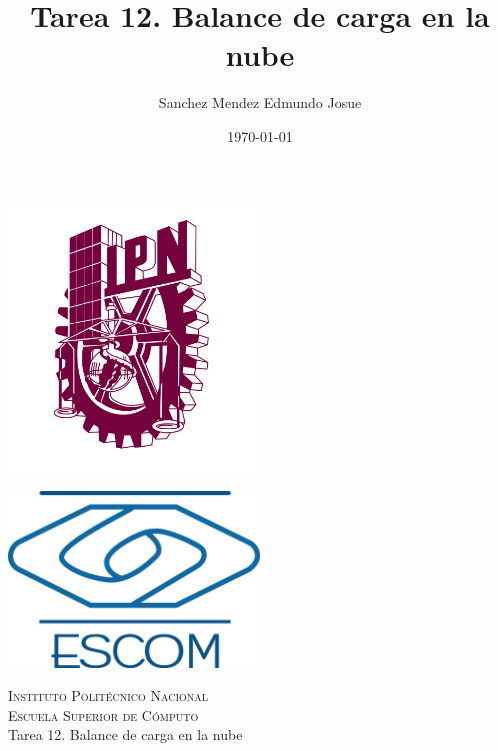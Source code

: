 \documentclass[11pt]{article}
\date{\today}
\title{Tarea 12. Balance de carga en la nube}
\author{Sanchez Mendez Edmundo Josue}
\begin{document}
		\begin{titlepage}
			\begin{center}
				
				
				\noindent
				\begin{minipage}{0.5\textwidth}
					\begin{flushleft} \large
						\includegraphics[width=0.5\textwidth]{resources/ipn.png}
					\end{flushleft}
				\end{minipage}%
				\begin{minipage}{0.55\textwidth}
					\begin{flushright} \large
						\includegraphics[width=0.5\textwidth]{resources/escom.png}
					\end{flushright}
				\end{minipage}
				
				\textsc{\LARGE Instituto Politécnico Nacional}\\[0.5cm]
				
				\textsc{\Large Escuela Superior de Cómputo}\\[1cm]
				
				
				{ \huge Tarea 12. Balance de carga en la nube \\[1cm] }
				

\end{center}
\end{titlepage}
\end{document}
